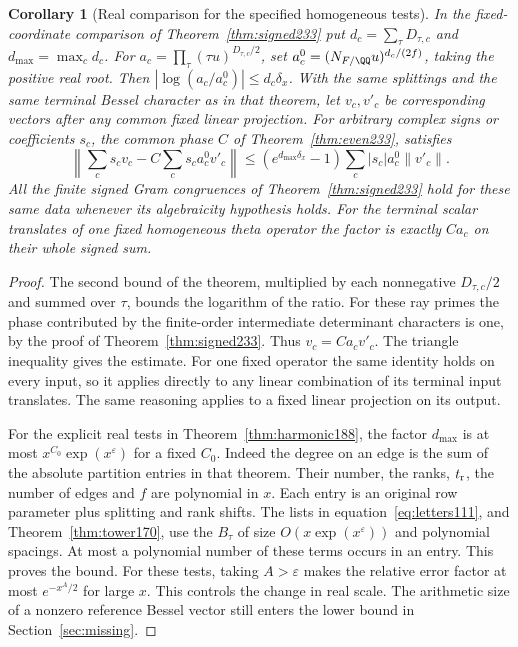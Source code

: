 \documentclass[a4paper,11pt]{article}
\newtheorem{corollary}[proposition]{Corollary}
\theoremstyle{definition}
\theoremstyle{remark}
\numberwithin{equation}{section}
\begin{document}
\begin{corollary}[Real comparison for the specified homogeneous tests]
\label{cor:parallel234}
In the fixed-coordinate comparison of Theorem~\ref{thm:signed233}
put \(d_c=\sum_\tau D_{\tau,c}\) and \(d_{\max}=\max_c d_c\).
For \(a_c=\prod_\tau(\tau u)^{D_{\tau,c}/2}\), set
\(a_c^0=(N_{F/\QQ}u)^{d_c/(2f)}\), taking the positive real root.
Then \(|\log(a_c/a_c^0)|\le d_c\delta_x\). With the same splittings
and the same terminal Bessel character as in that theorem, let
\(v_c,v'_c\) be corresponding vectors after any common fixed
linear projection. For arbitrary complex signs or coefficients
\(s_c\), the common phase \(C\) of Theorem~\ref{thm:even233},
satisfies
\[
 \left\|\sum_c s_c v_c-C\sum_c s_c a_c^0 v'_c\right\|
  \le (e^{d_{\max}\delta_x}-1)\sum_c |s_c|a_c^0\|v'_c\|.
\]
All the finite signed Gram congruences of Theorem~\ref{thm:signed233}
hold for these same data whenever its algebraicity hypothesis holds.
For the terminal scalar translates of one fixed homogeneous theta
operator the factor is exactly \(C a_c\) on their whole signed sum.
\end{corollary}
\begin{proof}
The second bound of the theorem, multiplied by each nonnegative
\(D_{\tau,c}/2\) and summed over \(\tau\), bounds the logarithm
of the ratio. For these ray primes the phase contributed by the
finite-order intermediate determinant characters is one, by the
proof of Theorem~\ref{thm:signed233}. Thus \(v_c=C a_c v'_c\).
The triangle inequality gives the estimate. For one fixed operator
the same identity holds on every input, so it applies directly to
any linear combination of its terminal input translates. The same
reasoning applies to a fixed linear projection on its output.

For the explicit real tests in Theorem~\ref{thm:harmonic188},
the factor \(d_{\max}\) is at most \(x^{C_0}\exp(x^\varepsilon)\)
for a fixed \(C_0\). Indeed the degree on an edge is the sum of
the absolute partition entries in that theorem. Their number, the
ranks, \(t_{\rm r}\), the number of edges and \(f\) are polynomial
in \(x\). Each entry is an original row parameter plus splitting
and rank shifts. The lists in equation~\eqref{eq:letters111},
and Theorem~\ref{thm:tower170}, use the \(B_\tau\)
of size \(O(x\exp(x^\varepsilon))\) and polynomial spacings.
At most a polynomial number of these terms occurs in an entry.
This proves the bound. For these tests, taking \(A>\varepsilon\)
makes the relative error factor at most \(e^{-x^A/2}\) for large
\(x\). This controls the change in real scale. The arithmetic size
of a nonzero reference Bessel vector still enters the lower bound
in Section~\ref{sec:missing}.
\end{proof}
\end{document}
